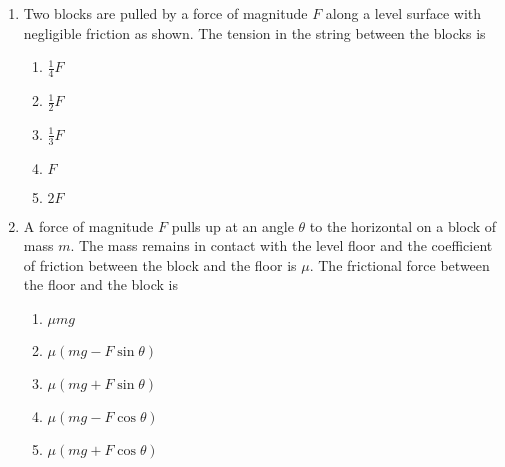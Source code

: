 \documentclass{../../oss-apphys}
\begin{document}
\begin{multicols}{2}
\begin{enumerate}[resume,leftmargin=18pt]

  \item Two blocks are pulled by a force of magnitude $F$ along a level surface
    with negligible friction as shown. The tension in the string between the
    blocks is
    \begin{center}
      \vspace{-.1in}
    \end{center}
    \begin{enumerate}[noitemsep,topsep=0pt,leftmargin=18pt,label=(\Alph*)]
    \item $\displaystyle\frac{1}{4}F$
    \item $\displaystyle\frac{1}{2}F$
    \item $\displaystyle\frac{1}{3}F$
    \item $F$
    \item $2F$
    \end{enumerate}
    
  \item A force of magnitude $F$ pulls up at an angle $\theta$ to the
    horizontal on a block of mass $m$. The mass remains in contact with the
    level floor and the coefficient of friction between the block and the floor
    is $\mu$. The frictional force between the floor and the block is
    \begin{center}
    \end{center}
    \begin{enumerate}[noitemsep,topsep=0pt,leftmargin=18pt,label=(\Alph*)]
    \item$\mu mg$
    \item$\mu (mg-F\sin\theta)$
    \item$\mu (mg+F\sin\theta)$
    \item$\mu (mg-F\cos\theta)$
    \item$\mu (mg+F\cos\theta)$
    \end{enumerate}


\end{enumerate}
\end{multicols}
\end{document}
